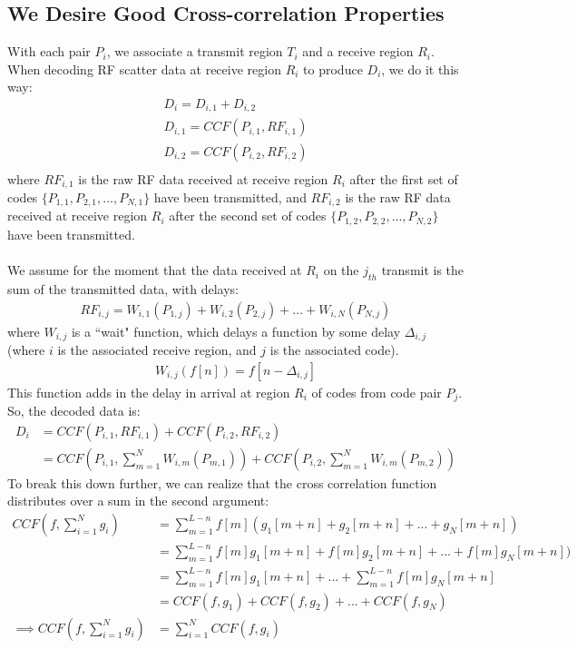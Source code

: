 \documentclass[a4paper]{article}
\begin{document}
\subsection*{We Desire Good Cross-correlation Properties}
With each pair $P_i$, we associate a transmit region $T_i$ and a receive region $R_i$. When decoding RF scatter data at receive region $R_i$ to produce $D_i$, we do it this way:
\begin{align*}
D_i = D_{i,1} + D_{i,2} \\
D_{i,1} = CCF(P_{i,1},RF_{i,1})\\
D_{i,2} = CCF(P_{i,2},RF_{i,2})\\
\end{align*}
where $RF_{i,1}$ is the raw RF data received at receive region $R_i$ after the first set of codes $\{P_{1,1},P_{2,1},...,P_{N,1}\}$ have been transmitted, and $RF_{i,2}$ is the raw RF data received at receive region $R_i$ after the second set of codes $\{P_{1,2},P_{2,2},...,P_{N,2}\}$ have been transmitted.
\\\\
We assume for the moment that the data received at $R_i$ on the $j_{th}$ transmit is the sum of the transmitted data, with delays:
\begin{align*}
 RF_{i,j} = W_{i,1}(P_{1,j})+W_{i,2}(P_{2,j})+...+W_{i,N}(P_{N,j})
\end{align*}
where $W_{i,j}$ is a ``wait" function, which delays a function by some delay $\Delta_{i,j}$ (where $i$ is the associated receive region, and $j$ is the associated code).
\begin{align*}
W_{i,j}(f[n]) = f[n-\Delta_{i,j}]
\end{align*}
This function adds in the delay in arrival at region $R_i$ of codes from code pair $P_j$.
\clearpage
So, the decoded data is:
\begin{align*}
D_i &= CCF(P_{i,1},RF_{i,1}) + CCF(P_{i,2},RF_{i,2}) \\
&= CCF\left(P_{i,1}, \sum_{m=1}^N W_{i,m}(P_{m,1})\right) + CCF\left(P_{i,2}, \sum_{m=1}^N W_{i,m}(P_{m,2})\right)
\end{align*}
To break this down further, we can realize that the cross correlation function distributes over a sum in the second argument:
\begin{align*}
CCF \left(f,\sum_{i = 1}^N g_i\right) &= \sum_{m=1}^{L-n}f[m](g_1[m+n] + g_2[m+n] +...+ g_N[m+n]) \\
&= \sum_{m=1}^{L-n}f[m]g_1[m+n] + f[m]g_2[m+n] +...+ f[m]g_N[m+n])\\
&= \sum_{m=1}^{L-n}f[m]g_1[m+n] +...+ \sum_{m=1}^{L-n}f[m]g_N[m+n]\\
&= CCF(f,g_1) + CCF(f,g_2)+...+CCF(f,g_N)\\
\implies
CCF \left(f,\sum_{i = 1}^N g_i\right) &= \sum_{i=1}^N CCF(f,g_i)
\end{align*}
\end{document}
